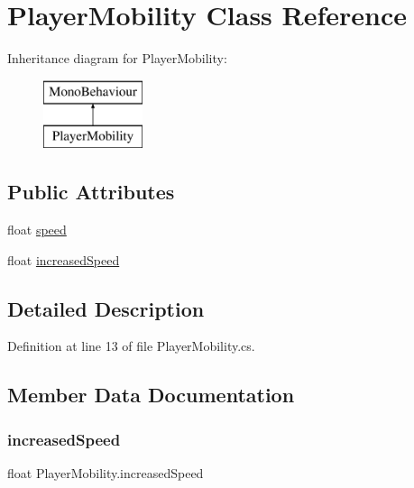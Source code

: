 \hypertarget{class_player_mobility}{}\section{Player\+Mobility Class Reference}
\label{class_player_mobility}
Inheritance diagram for Player\+Mobility\+:\begin{figure}[H]
\begin{center}
\leavevmode
\includegraphics[height=2.000000cm]{class_player_mobility}
\end{center}
\end{figure}
\subsection*{Public Attributes}
\begin{DoxyCompactItemize}
\item 
float \hyperlink{class_player_mobility_a336d35b5a58fc1ea25c0cb8eb88858f0}{speed}
\item 
float \hyperlink{class_player_mobility_aded47b1de0eaf2199854a771f521fe25}{increased\+Speed}
\end{DoxyCompactItemize}


\subsection{Detailed Description}


Definition at line 13 of file Player\+Mobility.\+cs.



\subsection{Member Data Documentation}
\hypertarget{class_player_mobility_aded47b1de0eaf2199854a771f521fe25}{}\label{class_player_mobility_aded47b1de0eaf2199854a771f521fe25} 
\subsubsection{\texorpdfstring{increased\+Speed}{increasedSpeed}}
{\footnotesize\ttfamily float Player\+Mobility.\+increased\+Speed}



